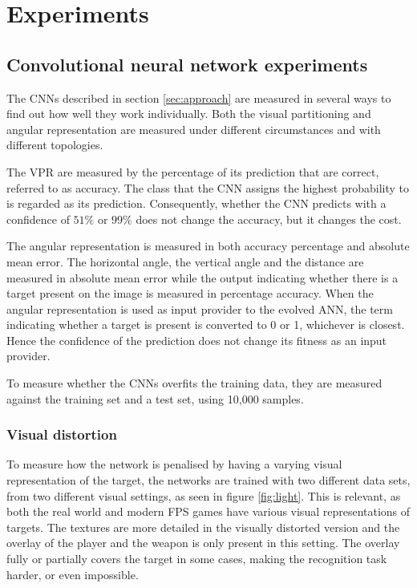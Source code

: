 \section{Experiments}
\label{sec:experiments}

\subsection{Convolutional neural network experiments}
\label{sec:cnnexperiments}
The CNNs described in section \ref{sec:approach} are measured in several ways to find out how well they work individually. Both the visual partitioning and angular representation are measured under different circumstances and with different topologies.

The VPR are measured by the percentage of its prediction that are correct, referred to as accuracy. The class that the CNN assigns the highest probability to is regarded as its prediction. Consequently, whether the CNN predicts with a confidence of $51\%$ or $99\%$ does not change the accuracy, but it changes the cost.

The angular representation is measured in both accuracy percentage and absolute mean error. The horizontal angle, the vertical angle and the distance are measured in absolute mean error while the output indicating whether there is a target present on the image is measured in percentage accuracy. When the angular representation is used as input provider to the evolved ANN, the term indicating whether a target is present is converted to 0 or 1, whichever is closest. Hence the confidence of the prediction does not change its fitness as an input provider. 

To measure whether the CNNs overfits the training data, they are measured against the training set and a test set, using 10,000 samples.

\subsubsection{Visual distortion}
To measure how the network is penalised by having a varying visual representation of the target, the networks are trained with two different data sets, from two different visual settings, as seen in figure \ref{fig:light}. This is relevant, as both the real world and modern FPS games have various visual representations of targets. The textures are more detailed in the visually distorted version and the overlay of the player and the weapon is only present in this setting. The overlay fully or partially covers the target in some cases, making the recognition task harder, or even impossible.

